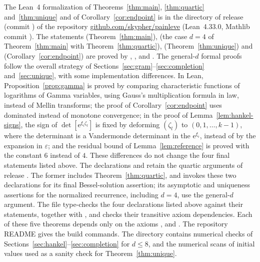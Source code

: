 \documentclass[twoside,10pt]{article}
\numberwithin{equation}{section}
\theoremstyle{slbody}
\theoremstyle{remark}
\newcommand{\e}{\mathrm e}
\begin{document}
The Lean~4 formalization of Theorems~\ref{thm:main}, \ref{thm:quartic}
and~\ref{thm:unique} and of Corollary~\ref{cor:endpoint} is in the
directory  of release
 (commit ) of the repository
\href{https://github.com/skypher/painleve}{github.com/skypher/painleve}
(Lean~4.33.0, Mathlib commit ).  The statements
 (Theorem~\ref{thm:main}),
 (the case \(d=4\) of Theorem~\ref{thm:main}
with Theorem~\ref{thm:quartic}), 
(Theorem~\ref{thm:unique}) and 
(Corollary~\ref{cor:endpoint}) are proved by
, ,
 and .
The general-\(d\) formal proofs follow the overall strategy of
Sections~\ref{sec:gram}--\ref{sec:completion} and~\ref{sec:unique},
with some implementation differences.  In Lean,
Proposition~\ref{prop:gamma} is proved by comparing characteristic
functions of logarithms of Gamma variables, using Gauss's
multiplication formula in law, instead of Mellin transforms; the proof
of Corollary~\ref{cor:endpoint} uses dominated instead of monotone
convergence; in the proof of Lemma~\ref{lem:hankel-signs}, the sign of
\(\det[\e^{\xi_i\zeta_l}]\) is fixed by deforming \((\zeta_l)\) to
\((0,1,\ldots,k-1)\), where the determinant is a Vandermonde
determinant in the \(\e^{\xi_i}\), instead of by the expansion in
\(\varepsilon\); and the residual bound of Lemma~\ref{lem:reference} is
proved with the constant \(6\) instead of \(4\).  These differences do
not change the four final statements listed above.  The declarations
 and  retain
the quartic arguments of release .  The former includes
Theorem~\ref{thm:quartic}, and  invokes
these two declarations for its final Bessel-solution assertion; its
asymptotic and uniqueness assertions for the normalized recurrence,
including \(d=4\), use the general-\(d\) argument.  The file
 type-checks the four declarations listed above
against their statements, together with
, and checks their
transitive axiom dependencies.  Each of these five theorems depends only
on the axioms ,  and
.  The repository README gives the build commands.
The directory
 contains numerical checks of
Sections~\ref{sec:hankel}--\ref{sec:completion} for \(d\leq8\), and
 the numerical scans of initial values used as a sanity
check for Theorem~\ref{thm:unique}.
\end{document}
